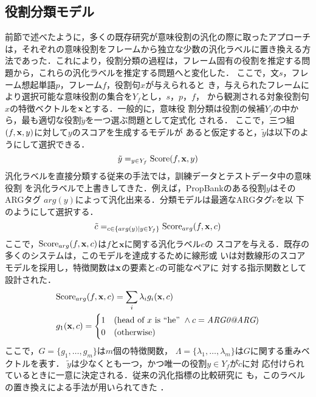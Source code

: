 \documentclass[japanese]{jnlp_1.4}
\newcommand{\argmax}{}
\begin{document}
\subsection{役割分類モデル}

前節で述べたように，多くの既存研究が意味役割の汎化の際に取ったアプローチ
は，それぞれの意味役割をフレームから独立な少数の汎化ラベルに置き換える方
法であった．これにより，役割分類の過程は，フレーム固有の役割を推定する問
題から，これらの汎化ラベルを推定する問題へと変化した．
ここで，文$s$，フレーム想起単語$p$，フレーム$f$，役割句$x$が与えられると
き，与えられたフレームにより選択可能な意味役割の集合を$Y_f$とし，$s$，$p$，$f$，
から観測される対象役割句$x$の特徴ベクトルを${\bf x}$とする．一般的に，意味役
割分類は役割の候補$Y_f$の中から，最も適切な役割$\tilde{y}$を一つ選ぶ問題として定式化
される．
ここで，三つ組$(f,{\bf x},y)$に対して$y$のスコアを生成するモデルが
あると仮定すると，$\tilde{y}$は以下のようにして選択できる．
\begin{equation}
 \tilde{y} = \argmax_{y \in Y_f} {\rm Score}(f,\mathbf{x},y)
\label{equ:frame-specific-class}
\end{equation}
汎化ラベルを直接分類する従来の手法では，訓練データとテストデータ中の意味役割
を汎化ラベルで上書きしてきた．例えば，PropBankのある役割$y$はそのARGタグ
$arg(y)$によって汎化出来る．分類モデルは最適なARGタグ$\tilde{c}$を以
下のようにして選択する．
\begin{equation}
\tilde{c} = \argmax_{c \in \{arg(y)|y \in Y_f\}} {\rm Score}_{arg}(f,\mathbf{x},c)
\end{equation}
ここで，${\rm Score}_{arg}(f,\mathbf{x},c)$は$f$と$\mathbf{x}$に関する汎化ラベル$c$の
スコアを与える．既存の多くのシステムは，このモデルを達成するために線形或
いは対数線形のスコアモデルを採用し，特徴関数は${\bf x}$の要素と$c$の可能なペアに
対する指示関数として設計された．
\begin{align}
& {\rm Score}_{arg}(f,\mathbf{x},c) =
	\sum_{i}\lambda_{i}g_i(\mathbf{x},c)\\
& g_1(\mathbf{x},c) = 
  \begin{cases}
   1 & (\mbox{head of }x\mbox{ is ``he''}~\wedge
   c = \mbox{{\it ARG0@ARG}})\\
   0 & (\mbox{otherwise})
  \end{cases}
\end{align} 
ここで，$G=\{g_1,\ldots,g_m\}$は$m$個の特徴関数，
$\Lambda=\{\lambda_1,\ldots,\lambda_m\}$は$G$に関する重みベクトルを表す．
$\tilde{y}$は少なくとも一つ，かつ唯一の役割$y\in Y_f$が$\tilde{c}$に対
応付けられているときに一意に決定される．従来の汎化指標の比較研究に
も，このラベルの置き換えによる手法が用いられてきた
．
\end{document}
